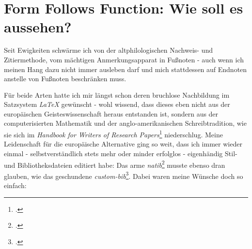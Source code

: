 %
%
%
%
\section{Form Follows Function: Wie soll es aussehen?}

Seit Ewigkeiten schwärme ich von der altphilologischen Nachweis- und
Zitiermethode, vom mächtigen Anmerkungsapparat in Fußnoten - auch wenn ich
meinen Hang dazu nicht immer ausleben darf und mich stattdessen auf Endnoten
anstelle von Fußnoten beschränken muss.

Für beide Arten hatte ich mir längst schon deren bruchlose Nachbildung im
Satzsystem \emph{LaTeX} gewünscht - wohl wissend, dass dieses eben nicht aus der
europäischen Geisteswissenschaft heraus entstanden ist, sondern aus der
computerisierten Mathematik und der anglo-amerikanischen Schreibtradition, wie
sie sich im \textit{Handbook for Writers of Research
Papers}\footcite[vgl.][]{ModLanAss2009a} niederschlug. Meine Leidenschaft für
die europäische Alternative ging so weit, dass ich immer wieder einmal -
selbstverständlich stets mehr oder minder erfolglos - eigenhändig Stil- und
Bibliotheksdateien editiert habe: Das arme
\emph{natib}\footcite[vgl.][]{Daly2000a} musste ebenso dran glauben, wie das
geschundene \emph{custom-bib}\footcite[vgl.][]{Daly2007a}. Dabei waren meine
Wünsche doch so einfach:

